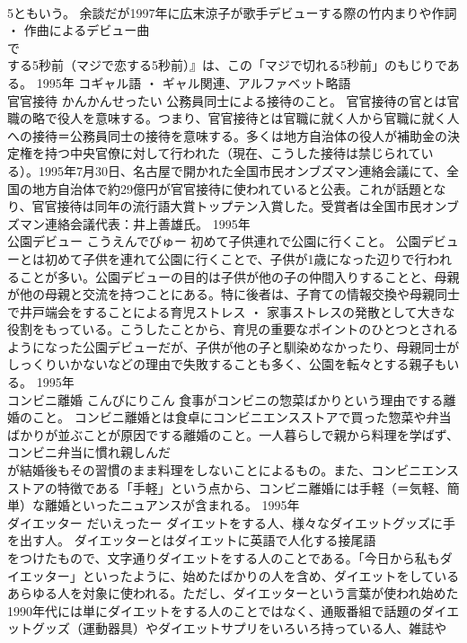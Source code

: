 \documentclass[8pt]{extreport}
\begin{document}
\begin{CJK}{UTF8}{min}
\\	5ともいう。 余談だが1997年に広末涼子が歌手デビューする際の竹内まりや作詞 ・ 作曲によるデビュー曲
\\	で
\\	する5秒前（マジで恋する5秒前）』は、この「マジで切れる5秒前」のもじりである。	1995年	コギャル語 ・ ギャル関連、アルファベット略語	
\\	官官接待	かんかんせったい	公務員同士による接待のこと。	官官接待の官とは官職の略で役人を意味する。つまり、官官接待とは官職に就く人から官職に就く人への接待＝公務員同士の接待を意味する。多くは地方自治体の役人が補助金の決定権を持つ中央官僚に対して行われた（現在、こうした接待は禁じられている）。1995年7月30日、名古屋で開かれた全国市民オンブズマン連絡会議にて、全国の地方自治体で約29億円が官官接待に使われていると公表。これが話題となり、官官接待は同年の流行語大賞トップテン入賞した。受賞者は全国市民オンブズマン連絡会議代表：井上善雄氏。	1995年	
\\	公園デビュー	こうえんでびゅー	初めて子供連れで公園に行くこと。	公園デビューとは初めて子供を連れて公園に行くことで、子供が1歳になった辺りで行われることが多い。公園デビューの目的は子供が他の子の仲間入りすることと、母親が他の母親と交流を持つことにある。特に後者は、子育ての情報交換や母親同士で井戸端会をすることによる育児ストレス ・ 家事ストレスの発散として大きな役割をもっている。こうしたことから、育児の重要なポイントのひとつとされるようになった公園デビューだが、子供が他の子と馴染めなかったり、母親同士がしっくりいかないなどの理由で失敗することも多く、公園を転々とする親子もいる。	1995年	
\\	コンビニ離婚	こんびにりこん	食事がコンビニの惣菜ばかりという理由でする離婚のこと。	コンビニ離婚とは食卓にコンビニエンスストアで買った惣菜や弁当ばかりが並ぶことが原因でする離婚のこと。一人暮らしで親から料理を学ばず、コンビニ弁当に慣れ親しんだ
\\	が結婚後もその習慣のまま料理をしないことによるもの。また、コンビニエンスストアの特徴である「手軽」という点から、コンビニ離婚には手軽（＝気軽、簡単）な離婚といったニュアンスが含まれる。	1995年	
\\	ダイエッター	だいえったー	ダイエットをする人、様々なダイエットグッズに手を出す人。	ダイエッターとはダイエットに英語で人化する接尾語
\\	をつけたもので、文字通りダイエットをする人のことである。「今日から私もダイエッター」といったように、始めたばかりの人を含め、ダイエットをしているあらゆる人を対象に使われる。ただし、ダイエッターという言葉が使われ始めた1990年代には単にダイエットをする人のことではなく、通販番組で話題のダイエットグッズ（運動器具）やダイエットサプリをいろいろ持っている人、雑誌や

\end{CJK}
\end{document}

